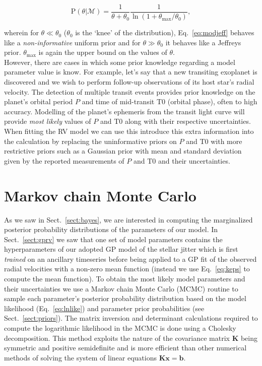 \begin{equation}
\mathrm{P} (\theta | \mathcal{M}) = \frac{1}{\theta+\theta_0} 
\frac{1}{\ln{(1+\theta_{\mathrm{max}}/\theta_0)}},
\label{eq:modjeff}
\end{equation}

\noindent wherein for $\theta \ll \theta_0$ ($\theta_0$ is the `knee' of the 
distribution), Eq.~\ref{eq:modjeff} behaves like 
a \emph{non-informative} uniform prior and for $\theta \gg \theta_0$ it behaves 
like a Jeffreys prior. $\theta_{\mathrm{max}}$ is again the upper bound on the values 
of $\theta$. \\

However, there are cases in which some prior knowledge regarding a model parameter 
value is know. For example, let's say that a new transiting exoplanet 
is discovered and we wish to perform follow-up observations of its host star's radial 
velocity. The detection of multiple transit events provides prior knowledge on the 
planet's orbital period $P$ and time of mid-transit T0 (orbital phase), often to 
high accuracy. Modelling of 
the planet's ephemeris from the transit light curve will provide \emph{most likely} 
values of $P$ and T0 along with their respective uncertainties. 
When fitting the RV model 
we can use this introduce this extra information into the calculation 
by replacing the uninformative priors on $P$ and T0 with 
more restrictive priors such as a Gaussian prior with mean and standard deviation given 
by the reported measurements of $P$ and T0 and their uncertainties. 


\section{Markov chain Monte Carlo} \label{sect:mcmc}
As we saw in Sect.~\ref{sect:bayes}, we are interested in computing the 
marginalized posterior probability distributions of the parameters of our model. 
In Sect.~\ref{sect:gprv} we saw that one set of model parameters contains 
the hyperparameters of our adopted GP model 
of the stellar jitter which is first \emph{trained} on an ancillary timeseries before 
being applied to a GP fit of the observed radial velocities with a non-zero 
mean function (instead we use Eq.~\ref{eq:keps} to compute the mean function). 
To obtain the most likely 
model parameters and their uncertainties we use a Markov chain Monte Carlo 
(MCMC) routine 
to sample each parameter's posterior probability distribution based on the model 
likelihood (Eq.~\ref{eq:lnlike}) and parameter prior probabilities (see 
Sect.~\ref{sect:priors}). 
The matrix inversion and determinant calculations required to compute the logarithmic 
likelihood in the MCMC is done using a Cholesky decomposition. This method exploits the 
nature of the covariance matrix $\mathbf{K}$ being symmetric and positive semidefinite 
and is more efficient than other numerical methods of solving the system 
of linear equations $\mathbf{K} \mathbf{x} = \mathbf{b}$. 

